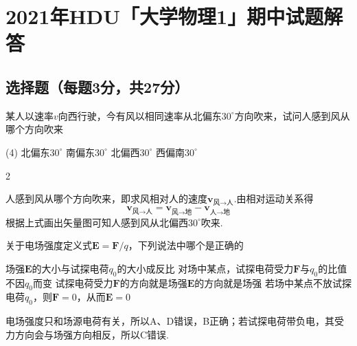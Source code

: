 \chapter*{2021年\textsf{HDU}「大学物理1」期中试题解答}



\section{选择题（每题3分，共27分）}

\begin{problem}
    某人以速率$v$向西行驶，今有风以相同速率从北偏东$30^{\circ}$方向吹来，试问人感到风从哪个方向吹来
    \begin{tasks}(4)
        \task 北偏东$30^{\circ}$
        \task 南偏东$30^{\circ}$
        \task[\true] 北偏西$30^{\circ}$
        \task 西偏南$30^{\circ}$
    \end{tasks}
\end{problem}
\begin{paracol}{2}
\begin{solution}
    人感到风从哪个方向吹来，即求风相对人的速度$\bm v_{\text{风}\to\text{人}}$.由相对运动关系得
    \[\bm v_{\text{风}\to\text{人}}=\bm v_{\text{风}\to\text{地}}-\bm v_{\text{人}\to\text{地}}\]
    根据上式画出矢量图可知人感到风从北偏西$30^{\circ}$吹来.
    \switchcolumn\vspace*{\fill}\centering
    \vspace*{\fill}
\end{solution}
\end{paracol}

\begin{problem}
    关于电场强度定义式$\bm E=\bm F/q$，下列说法中哪个是正确的
    \begin{tasks}
        \task 场强$\bm E$的大小与试探电荷$q_0$的大小成反比
        \task[\true] 对场中某点，试探电荷受力$\bm F$与$q_0$的比值不因$q_0$而变
        \task 试探电荷受力$\bm F$的方向就是场强$\bm E$的方向就是场强
        \task 若场中某点不放试探电荷$q_0$，则$\bm F=0$，从而$\bm E=0$
    \end{tasks}
\end{problem}
\begin{solution}
    电场强度只和场源电荷有关，所以A、D错误，B正确；若试探电荷带负电，其受力方向会与场强方向相反，所以C错误.
\end{solution}

